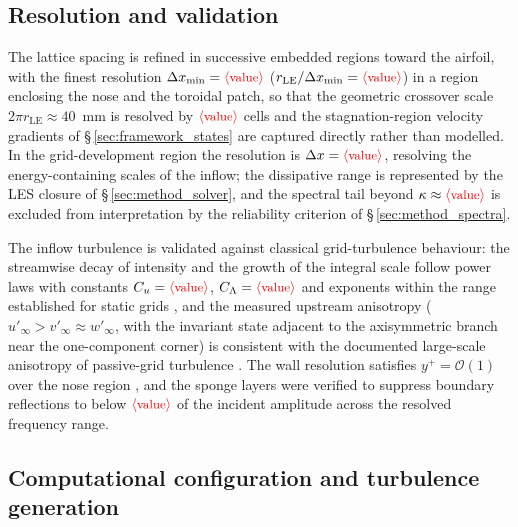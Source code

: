 \documentclass[lineno]{JFM-FLM_Au}
\newcommand{\tbd}[1]{\textcolor{red}{\ensuremath{\langle\mbox{\small #1}\rangle}}}
\begin{document}
\subsection{Resolution and validation}
\label{sec:method_resolution}

The lattice spacing is refined in successive embedded regions toward the
airfoil, with the finest resolution
$\Delta x_{\min} = \tbd{value}$ ($r_{\mathrm{LE}}/\Delta x_{\min}
= \tbd{value}$) in a region enclosing the nose and the toroidal patch,
so that the geometric crossover scale $2\pi r_{\mathrm{LE}} \approx
40$~mm is resolved by $\tbd{value}$ cells and the stagnation-region
velocity gradients of \S\,\ref{sec:framework_states} are captured
directly rather than modelled. In the grid-development region the
resolution is $\Delta x = \tbd{value}$, resolving the energy-containing
scales of the inflow; the dissipative range is represented by the LES
closure of \S\,\ref{sec:method_solver}, and the spectral tail beyond
$\kappa \approx \tbd{value}$ is excluded from interpretation by the
reliability criterion of \S\,\ref{sec:method_spectra}.

The inflow turbulence is validated against classical grid-turbulence
behaviour: the streamwise decay of intensity and the growth of the
integral scale follow power laws with constants
$C_u = \tbd{value}$, $C_\Lambda = \tbd{value}$ and exponents within the
range established for static grids
\citep{ComteBellotCorrsin1971,Roach1987,Ertunc2010}, and the measured
upstream anisotropy ($u'_\infty > v'_\infty \approx w'_\infty$, with the
invariant state adjacent to the axisymmetric branch near the
one-component corner) is consistent with the documented large-scale
anisotropy of passive-grid turbulence \citep{ComteBellotCorrsin1971,
Ertunc2010}. The wall resolution satisfies $y^+ = \mathcal{O}(1)$ over
the nose region
, and the sponge layers were verified to suppress boundary reflections to
below $\tbd{value}$ of the incident amplitude across the resolved
frequency range.

\newpage
\subsection{Computational configuration and turbulence generation}
\label{sec:method_configuration}
\end{document}
